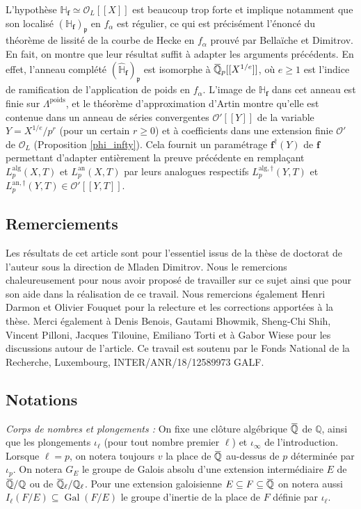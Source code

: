 \documentclass[12pt]{amsart}
\newcommand\bQ{\mathbb{Q}}
\newcommand\bH{\mathbb{H}}
\newcommand\cO{\mathcal{O}}
\newcommand\gp{\mathfrak{p}}
\newcommand{\ob}[1]{\mkern 1.5mu\overline{\mkern-1.5mu#1\mkern-1.5mu}\mkern 1.5mu}
\newcommand{\an}{\textrm{an}}
\newcommand{\alg}{\textrm{alg}}
\DeclareMathOperator{\Gal}{Gal}
\theoremstyle{defstyle}
\theoremstyle{thmstyle}
\begin{document}
L'hypothèse $\bH_\textbf{f}\simeq \cO_L[[X]]$ est beaucoup trop forte et implique notamment que son localisé $\left(\bH_\textbf{f}\right)_\gp$ en $f_\alpha$ est régulier, ce qui est précisément l'énoncé du théorème de lissité de la courbe de Hecke en $f_\alpha$ prouvé par Bellaïche et Dimitrov. En fait, on montre que leur résultat suffit à adapter les arguments précédents. En effet, l'anneau complété $\left(\widehat{\bH}_\textbf{f}\right)_\gp$ est isomorphe à $\ob{\bQ}_p[[X^{1/e}]]$, où $e\geq 1$ est l'indice de ramification de l'application de poids en $f_\alpha$. L'image de $\bH_\textbf{f}$ dans cet anneau est finie sur $\Lambda^\textrm{poids}$, et le théorème d'approximation d'Artin \cite{artin1968solutions} montre qu'elle est contenue dans un anneau de séries convergentes $\cO'[[Y]]$ de la variable $Y=X^{1/e}/p^r$ (pour un certain $r\geq 0$) et à coefficients dans une extension finie $\cO'$ de $\cO_L$ (Proposition \ref{phi_infty}). Cela fournit un paramétrage $\textbf{f}^\dag(Y)$ de $\textbf{f}$ permettant d'adapter entièrement la preuve précédente en remplaçant $L_p^{\alg}(X,T)$ et $L_p^{\an}(X,T)$ par leurs analogues respectifs $L_p^{\alg,\dag}(Y,T)$ et $L_p^{\an,\dag}(Y,T)\in \cO'[[Y,T]]$.

\subsection*{Remerciements} 
Les résultats de cet article sont pour l'essentiel issus de la thèse de doctorat de l'auteur sous la direction de Mladen Dimitrov. Nous le remercions chaleureusement pour nous avoir proposé de travailler sur ce sujet ainsi que pour son aide dans la réalisation de ce travail. Nous remercions également Henri Darmon et Olivier Fouquet pour la relecture et les corrections apportées à la thèse. Merci également à Denis Benois, Gautami Bhowmik, Sheng-Chi Shih, Vincent Pilloni, Jacques Tilouine, Emiliano Torti et à Gabor Wiese pour les discussions autour de l'article. Ce travail est soutenu par le Fonds National de la Recherche, Luxembourg, INTER/ANR/18/12589973 GALF.

\subsection*{Notations}

\textit{Corps de nombres et plongements :} On fixe une clôture algébrique $\ob{\bQ}$ de $\bQ$, ainsi que les plongements $\iota_\ell$ (pour tout nombre premier $\ell$) et $\iota_\infty$ de l'introduction. Lorsque $\ell=p$, on notera toujours $v$ la place de $\ob{\bQ}$ au-dessus de $p$ déterminée par $\iota_p$. On notera $G_E$ le groupe de Galois absolu d'une extension intermédiaire $E$ de $\ob{\bQ}/\bQ$ ou de $\ob{\bQ}_\ell/\bQ_\ell$. Pour une extension galoisienne $E \subseteq F \subseteq \ob{\bQ}$ on notera aussi $I_\ell(F/E)\subseteq \Gal(F/E)$ le groupe d'inertie de la place de $F$ définie par $\iota_\ell$. 
\end{document}
